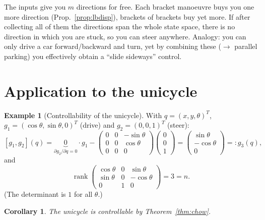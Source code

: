 \documentclass[11pt,a4paper]{article}
\DeclareMathOperator{\rank}{rank}
\newcommand{\LB}[2]{[#1,#2]}
\theoremstyle{definition}
\newtheorem{example}[definition]{Example}
\theoremstyle{plain}
\newtheorem{corollary}[definition]{Corollary}
\theoremstyle{remark}
\begin{document}
\begin{intuition}
The inputs give you $m$ directions for free. Each bracket manoeuvre buys you one more direction (Prop.~\ref{prop:lbdisp}), brackets of brackets buy yet more. If after collecting all of them the directions span the whole state space, there is no direction in which you are stuck, so you can steer anywhere. Analogy: you can only drive a car forward/backward and turn, yet by combining these ($\to$ parallel parking) you effectively obtain a ``slide sideways'' control.
\end{intuition}

\section{Application to the unicycle}

\begin{example}[Controllability of the unicycle]
With $q=(x,y,\theta)^T$, $g_1=(\cos\theta,\sin\theta,0)^T$ (drive) and $g_2=(0,0,1)^T$ (steer):
\[
\LB{g_1}{g_2}(q)=\underbrace{0}_{\partial g_2/\partial q=0}\cdot g_1-\begin{pmatrix}0&0&-\sin\theta\\0&0&\cos\theta\\0&0&0\end{pmatrix}\begin{pmatrix}0\\0\\1\end{pmatrix}
=\begin{pmatrix}\sin\theta\\-\cos\theta\\0\end{pmatrix}=:g_3(q),
\]
and
\[
\rank\begin{pmatrix}\cos\theta&0&\sin\theta\\\sin\theta&0&-\cos\theta\\0&1&0\end{pmatrix}=3=n .
\]
(The determinant is $1$ for all $\theta$.)
\end{example}

\begin{corollary}
The unicycle is controllable by Theorem~\ref{thm:chow}.
\end{corollary}
\end{document}
